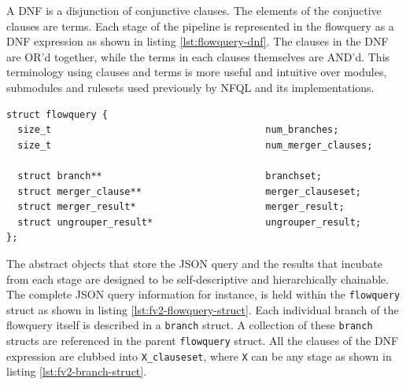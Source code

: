 A \ac{DNF} is a disjunction of conjunctive clauses. The elements of the
conjuctive clauses are terms. Each stage of the pipeline is represented in the
flowquery as a \ac{DNF} expression as shown in listing
\ref{lst:flowquery-dnf}. The clauses  in the \ac{DNF} are OR'd together, while the terms in each
clauses themselves are AND'd. This terminology using clauses and terms is
more useful and intuitive over modules, submodules and rulesets used
previously by \ac{NFQL} and its implementations.

\begin{lstlisting}
struct flowquery {
  size_t                                      num_branches;
  size_t                                      num_merger_clauses;

  struct branch**                             branchset;
  struct merger_clause**                      merger_clauseset;
  struct merger_result*                       merger_result;
  struct ungrouper_result*                    ungrouper_result;
};
\end{lstlisting}

The abstract objects that store the JSON query and the results that incubate
from each stage are designed to be self-descriptive and hierarchically
chainable. The complete JSON query information for instance, is held within
the \texttt{flowquery}  struct as shown
in listing \ref{lst:fv2-flowquery-struct}. Each individual branch of the
flowquery itself is described in a \texttt{branch} struct. A collection of
these \texttt{branch} structs are referenced in the parent \texttt{flowquery}
struct. All the clauses of the \ac{DNF} expression are clubbed into
\texttt{X\_clauseset}, where \texttt{X} can be any stage as shown in listing
\ref{lst:fv2-branch-struct}.

